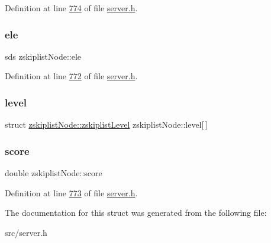 Definition at line \hyperlink{server_8h_source_l00774}{774} of file \hyperlink{server_8h_source}{server.\+h}.

\mbox{\label{structzskiplistNode_a3c96adcae9728744d54851c1a9fdc0b0}} 
\subsubsection{\texorpdfstring{ele}{ele}}
{\footnotesize\ttfamily sds zskiplist\+Node\+::ele}



Definition at line \hyperlink{server_8h_source_l00772}{772} of file \hyperlink{server_8h_source}{server.\+h}.

\mbox{\label{structzskiplistNode_abdd02b955494f3a036cd67c3df3becc6}} 
\subsubsection{\texorpdfstring{level}{level}}
{\footnotesize\ttfamily struct \hyperlink{structzskiplistNode_structzskiplistNode_1_1zskiplistLevel}{zskiplist\+Node\+::zskiplist\+Level}  zskiplist\+Node\+::level\mbox{[}$\,$\mbox{]}}

\mbox{\label{structzskiplistNode_a2e1fccfc9c9b17d179ee36259e230104}} 
\subsubsection{\texorpdfstring{score}{score}}
{\footnotesize\ttfamily double zskiplist\+Node\+::score}



Definition at line \hyperlink{server_8h_source_l00773}{773} of file \hyperlink{server_8h_source}{server.\+h}.



The documentation for this struct was generated from the following file\+:\begin{DoxyCompactItemize}
\item 
src/server.\+h\end{DoxyCompactItemize}
